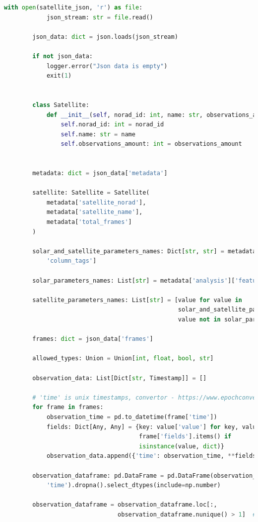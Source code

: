 \documentclass[14pt, a4paper]{extreport}
\begin{document}
    \begin{lstlisting}[language=python, label={lst:dot_diagram_code}]
        with open(satellite_json, 'r') as file:
            json_stream: str = file.read()

        json_data: dict = json.loads(json_stream)

        if not json_data:
            logger.error("Json data is empty")
            exit(1)


        class Satellite:
            def __init__(self, norad_id: int, name: str, observations_amount: int):
                self.norad_id: int = norad_id
                self.name: str = name
                self.observations_amount: int = observations_amount


        metadata: dict = json_data['metadata']

        satellite: Satellite = Satellite(
            metadata['satellite_norad'],
            metadata['satellite_name'],
            metadata['total_frames']
        )

        solar_and_satellite_parameters_names: Dict[str, str] = metadata['analysis'][
            'column_tags']

        solar_parameters_names: List[str] = metadata['analysis']['feature_columns']

        satellite_parameters_names: List[str] = [value for value in
                                                 solar_and_satellite_parameters_names if
                                                 value not in solar_parameters_names]

        frames: dict = json_data['frames']

        allowed_types: Union = Union[int, float, bool, str]

        observation_data: List[Dict[str, Timestamp]] = []

        # 'time' is unix timestamps, convertor - https://www.epochconverter.com/
        for frame in frames:
            observation_time = pd.to_datetime(frame['time'])
            fields: Dict[Any, Any] = {key: value['value'] for key, value in
                                      frame['fields'].items() if
                                      isinstance(value, dict)}
            observation_data.append({'time': observation_time, **fields})

        observation_dataframe: pd.DataFrame = pd.DataFrame(observation_data).set_index(
            'time').dropna().select_dtypes(include=np.number)

        observation_dataframe = observation_dataframe.loc[:,
                                observation_dataframe.nunique() > 1]  # Select columns with more than 1 unique value
    \end{lstlisting}
    
\end{document}

